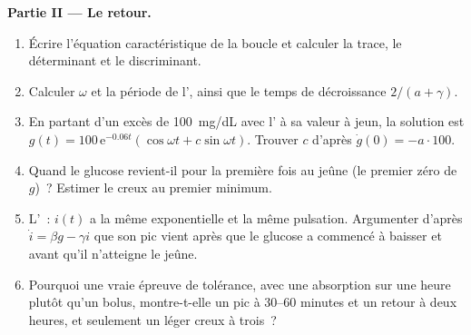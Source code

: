 \begin{problem}
\medskip
\noindent\textbf{Partie II --- Le retour.}
\begin{enumerate}[resume]
  \item Écrire l'équation caractéristique de la boucle et calculer la
        trace, le déterminant et le discriminant.
  \item Calculer $\omega$ et la période de l', ainsi
        que le temps de décroissance $2/(a + \gamma)$.
  \item En partant d'un excès de \qty{100}{mg/dL} avec l' à sa
        valeur à jeun, la solution est $g(t) = 100\,\mathrm{e}^{-0.06t}
        (\cos\omega t + c\sin\omega t)$. Trouver $c$ d'après $\dot g(0) = -a\cdot
        100$.
  \item Quand le glucose revient-il pour la première fois au jeûne (le
        premier zéro de $g$)~? Estimer le creux au premier minimum.
  \item L'~: $i(t)$ a la même exponentielle et la même
        pulsation. Argumenter d'après $\dot i = \beta g - \gamma i$ que
        son pic vient après que le glucose a commencé à baisser et avant
        qu'il n'atteigne le jeûne.
  \item Pourquoi une vraie épreuve de tolérance, avec une absorption sur
        une heure plutôt qu'un bolus, montre-t-elle un pic à 30--60
        minutes et un retour à deux heures, et seulement un léger creux
        à trois~?
\end{enumerate}


\end{problem}
